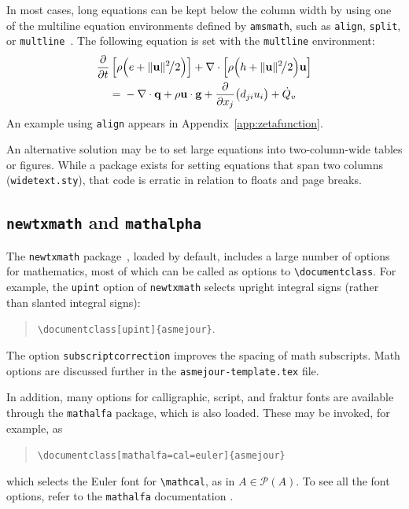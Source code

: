 \documentclass[subscriptcorrection,upint,varvw,mathalfa=cal=euler,barcolor=black,balance,hyphenate,french,pdf-a,nolists]{asmejour}
\begin{document}
In most cases, long equations can be kept below the column width by using one of the multiline equation environments defined by \texttt{amsmath},
such as \texttt{align}, \texttt{split}, or \texttt{multline}~\cite{amsmath}. The following equation is set with the \texttt{multline} environment:
\begin{multline}
\frac{\partial}{\partial t}\left[\rho\Bigl(e + \lVert\mathbf{u}\rVert^2\mspace{-3mu}\big/2\Bigr)\right]  + \nabla\cdot\left[\rho\Bigl(h + \lVert\mathbf{u}\rVert^2\mspace{-3mu}\big/2 \Bigr)\mathbf{u}\right]\\
 ={}-\nabla \cdot \mathbf{q} +  \rho \mathbf{u}\cdot\mathbf{g}+ \frac{\partial}{\partial x_j}\bigl(d_{ji}u_i\bigr) + \dot{Q}_v\label{eqn:energy}
\end{multline}
An example using \texttt{align} appears in Appendix~\ref{app:zetafunction}.

An alternative solution may be to set large equations into two-column-wide tables or figures. While a package exists for setting equations that span two columns (\texttt{widetext.sty}), that code is erratic in relation to floats and page breaks.

\subsection{\texttt{newtxmath} and \texttt{mathalpha}} The \texttt{newtxmath} package~\cite{sharpe1}, loaded by default, includes a large number of options for mathematics, most of which can be called as options to \verb|\documentclass|. For example, the \texttt{upint} option of \texttt{newtxmath} selects upright integral signs (rather than slanted integral signs):
\begin{quote}
\verb|\documentclass[upint]{asmejour}|.
\end{quote}
The option \verb|subscriptcorrection| improves the spacing of math subscripts. Math options are discussed further in the \texttt{asmejour-template.tex} file.

In addition, many options for calligraphic, script, and fraktur fonts are available through the \texttt{mathalfa} package, which is also loaded. These may be invoked, for example, as
\begin{quote}
\verb|\documentclass[mathalfa=cal=euler]{asmejour}|
\end{quote}
which selects the Euler font for \verb|\mathcal|, as in $A \in \mathcal{P}(A)$. %
To see all the font options, refer to the \texttt{mathalfa} documentation \cite{sharpe2}.
\end{document}
